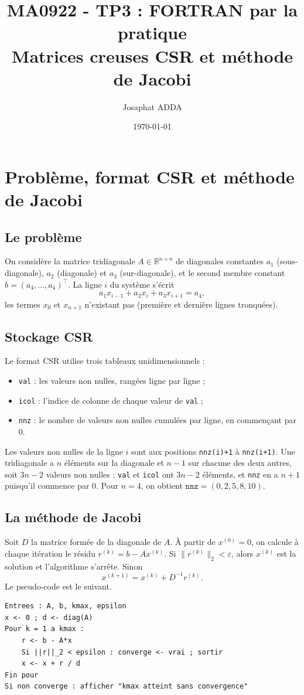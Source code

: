\documentclass[a4paper]{scrartcl}
\title{MA0922 - TP3 : FORTRAN par la pratique\\ \large Matrices creuses CSR et méthode de Jacobi}
\author{Josaphat ADDA \href{mailto:josaphat.adda@etudiant.univ-reims.fr}{\faEnvelopeO}}
\date{\today}
\begin{document}
\maketitle
\tableofcontents

\section{Problème, format CSR et méthode de Jacobi}

\subsection{Le problème}

On considère la matrice tridiagonale $A\in\mathbb{R}^{n\times n}$ de diagonales constantes $a_1$ (sous-diagonale), 
$a_2$ (diagonale) et $a_3$ (sur-diagonale), et le second membre constant $b=(a_4,\dots,a_4)^\top$. La ligne $i$ du système s'écrit
\[
a_1x_{i-1}+a_2x_i+a_3x_{i+1}=a_4,
\]
les termes $x_0$ et $x_{n+1}$ n'existant pas (première et dernière lignes tronquées).

\subsection{Stockage CSR}

Le format CSR utilise trois tableaux unidimensionnels :
\begin{itemize}
\item \lstinline{val} : les valeurs non nulles, rangées ligne par ligne ;
\item \lstinline{icol} : l'indice de colonne de chaque valeur de \lstinline{val} ;
\item \lstinline{nnz} : le nombre de valeurs non nulles cumulées par ligne, en commençant par $0$.
\end{itemize}
Les valeurs non nulles de la ligne $i$ sont aux positions \lstinline{nnz(i)+1} à \lstinline{nnz(i+1)}. 
Une tridiagonale a $n$ éléments sur la diagonale et $n-1$ sur chacune des deux autres, soit $3n-2$ valeurs non nulles : 
\lstinline{val} et \lstinline{icol} ont $3n-2$ éléments, et \lstinline{nnz} en a $n+1$ puisqu'il commence par $0$. 
Pour $n=4$, on obtient $\texttt{nnz}=(0,2,5,8,10)$.

\subsection{La méthode de Jacobi}

Soit $D$ la matrice formée de la diagonale de $A$. À partir de $x^{(0)}=0$, on calcule à chaque itération le résidu
 $r^{(k)}=b-Ax^{(k)}$. Si $\|r^{(k)}\|_2<\varepsilon$, alors $x^{(k)}$ est la solution et l'algorithme s'arrête. Sinon
\[
x^{(k+1)}=x^{(k)}+D^{-1}r^{(k)}.
\]
Le pseudo-code est le suivant.
\begin{lstlisting}[language={}]
Entrees : A, b, kmax, epsilon
x <- 0 ; d <- diag(A)
Pour k = 1 a kmax :
    r <- b - A*x
    Si ||r||_2 < epsilon : converge <- vrai ; sortir
    x <- x + r / d
Fin pour
Si non converge : afficher "kmax atteint sans convergence"
\end{lstlisting}
\end{document}
